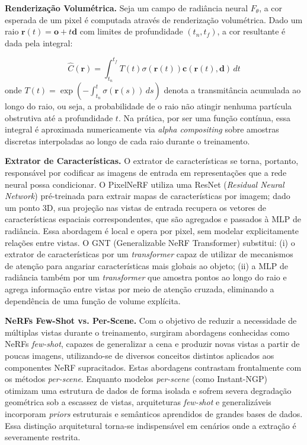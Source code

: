 \documentclass[12pt]{article}
\begin{document}
\textbf{Renderização Volumétrica.} Seja um campo de radiância neural $F_\theta$, a cor esperada de um pixel é computada através de renderização volumétrica. Dado um raio $\mathbf{r}(t) = \mathbf{o} + t\mathbf{d}$ com limites de profundidade $(t_n, t_f)$, a cor resultante é dada pela integral:

\[
\hat{C}(\mathbf{r}) = \int_{t_n}^{t_f} T(t) \sigma(\mathbf{r}(t)) \mathbf{c}(\mathbf{r}(t), \mathbf{d}) \, dt
\]
onde $T(t) = \exp\left(-\int_{t_n}^t \sigma(\mathbf{r}(s)) \, ds\right)$ denota a transmitância acumulada ao longo do raio, ou seja, a probabilidade de o raio não atingir nenhuma partícula obstrutiva até a profundidade $t$. Na prática, por ser uma função contínua, essa integral é aproximada numericamente via \textit{alpha compositing} sobre amostras discretas interpoladas ao longo de cada raio durante o treinamento.

\textbf{Extrator de Características.} O extrator de características se torna, portanto, responsável por codificar as imagens de entrada em representações que a rede neural possa condicionar. O PixelNeRF \cite{yu2021pixelnerfneuralradiancefields} utiliza uma ResNet (\textit{Residual Neural Network}) pré-treinada para extrair mapas de características por imagem; dado um ponto 3D, sua projeção nas vistas de entrada recupera os vetores de características espaciais correspondentes, que são agregados e passados à MLP de radiância. Essa abordagem é local e opera por pixel, sem modelar explicitamente relações entre vistas. O GNT (Generalizable NeRF Transformer) \cite{t2023attentionnerfneeds} substitui: (i) o extrator de características por um \textit{transformer} capaz de utilizar de mecanismos de atenção para angariar características mais globais ao objeto; (ii) a MLP de radiância também por um \textit{transformer} que amostra pontos ao longo do raio e agrega informação entre vistas por meio de atenção cruzada, eliminando a dependência de uma função de volume explícita.


\textbf{NeRFs Few-Shot vs. Per-Scene.} Com o objetivo de reduzir a necessidade de múltiplas vistas durante o treinamento, surgiram abordagens conhecidas como NeRFs \textit{few-shot}, capazes de generalizar a cena e produzir novas vistas a partir de poucas imagens, utilizando-se de diversos conceitos distintos aplicados aos componentes NeRF supracitados. Estas abordagens contrastam frontalmente com os métodos \textit{per-scene}. Enquanto modelos \textit{per-scene} (como Instant-NGP) otimizam uma estrutura de dados de forma isolada e sofrem severa degradação geométrica sob a escassez de vistas, arquiteturas \textit{few-shot} e generalizáveis incorporam \textit{priors} estruturais e semânticos aprendidos de grandes bases de dados. Essa distinção arquitetural torna-se indispensável em cenários onde a extração é severamente restrita.
\end{document}
